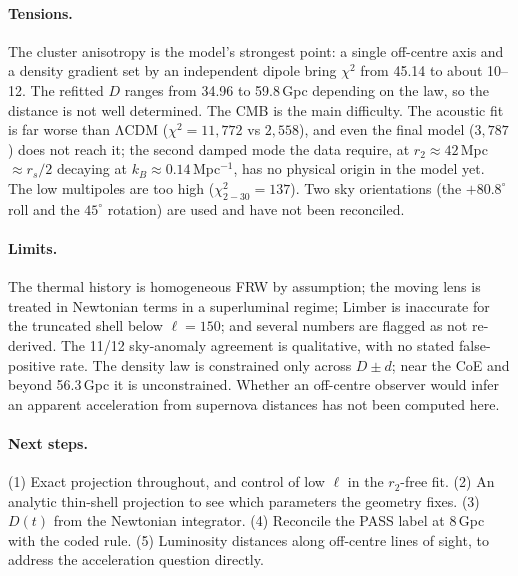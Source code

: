 \documentclass[10pt,twocolumn]{article}
\begin{document}
\paragraph{Tensions.} The cluster anisotropy is the model's strongest point: a single off-centre axis and a density gradient set by an independent dipole bring $\chi^2$ from 45.14 to about 10--12. The refitted $D$ ranges from 34.96 to 59.8\,Gpc depending on the law, so the distance is not well determined. The CMB is the main difficulty. The acoustic fit is far worse than ΛCDM ($\chi^2=11{,}772$ vs $2{,}558$), and even the final model ($3{,}787$) does not reach it; the second damped mode the data require, at $r_2\approx42$\,Mpc $\approx r_s/2$ decaying at $k_B\approx0.14$\,Mpc$^{-1}$, has no physical origin in the model yet. The low multipoles are too high ($\chi^2_{2-30}=137$). Two sky orientations (the $+80.8^\circ$ roll and the $45^\circ$ rotation) are used and have not been reconciled.
\paragraph{Limits.} The thermal history is homogeneous FRW by assumption; the moving lens is treated in Newtonian terms in a superluminal regime; Limber is inaccurate for the truncated shell below $\ell=150$; and several numbers are flagged as not re-derived. The 11/12 sky-anomaly agreement is qualitative, with no stated false-positive rate. The density law is constrained only across $D\pm d$; near the CoE and beyond 56.3\,Gpc it is unconstrained. Whether an off-centre observer would infer an apparent acceleration from supernova distances has not been computed here.
\paragraph{Next steps.} (1) Exact projection throughout, and control of low $\ell$ in the $r_2$-free fit. (2) An analytic thin-shell projection to see which parameters the geometry fixes. (3) $D(t)$ from the Newtonian integrator. (4) Reconcile the PASS label at 8\,Gpc with the coded rule. (5) Luminosity distances along off-centre lines of sight, to address the acceleration question directly.
\end{document}
